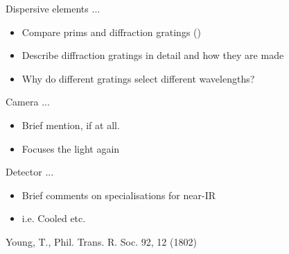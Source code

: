 Dispersive elements ...
\begin{itemize}
    \item Compare prims and diffraction gratings ()
    \item Describe diffraction gratings in detail and how they are made
    \item Why do different gratings select different wavelengths?
\end{itemize}

Camera ...
\begin{itemize}
     \item Brief mention, if at all.
     \item Focuses the light again
 \end{itemize}

Detector ...
\begin{itemize}
    \item Brief comments on specialisations for near-IR
    \item i.e. Cooled etc.
\end{itemize}


Young, T., Phil. Trans. R. Soc. 92, 12 (1802)








